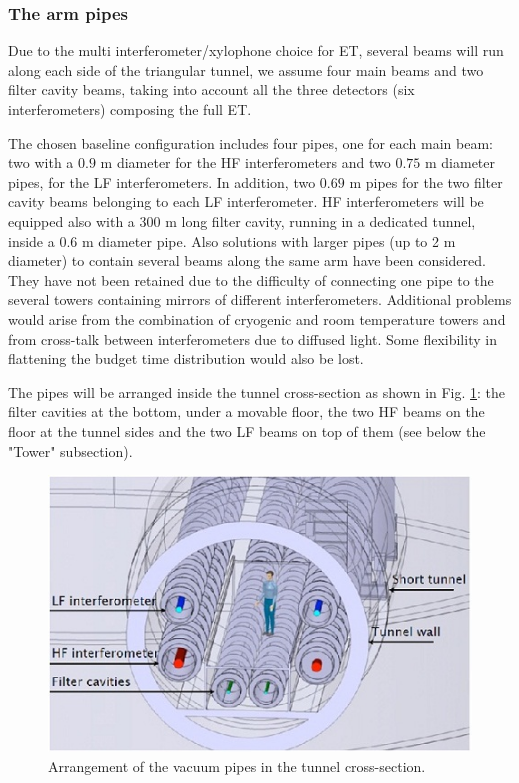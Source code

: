 \subsubsection{The arm pipes}

Due to the multi interferometer/xylophone choice for ET, several beams will run along each side of the triangular tunnel, we assume four main beams and two filter cavity beams, taking into account all the three detectors (six interferometers) composing the full ET.

The chosen baseline configuration includes four pipes, one for each main beam: two with a $0.9$ m diameter for the HF interferometers and two $0.75$ m diameter pipes, for the LF interferometers. In addition, two $0.69$ m pipes for the two filter cavity beams belonging to each LF interferometer. HF interferometers will be equipped also with a 300 m long filter cavity, running in a dedicated tunnel, inside a 0.6 m diameter pipe. Also solutions with larger pipes (up to 2 m diameter) to contain several beams along the same arm have been considered. They have not been retained due to the difficulty of connecting one pipe to the several towers containing mirrors of different interferometers. Additional problems would arise from the combination of cryogenic and room temperature towers and from cross-talk between interferometers due to diffused light. Some flexibility in flattening the budget time distribution would also be lost.

The pipes will be arranged inside the tunnel cross-section as shown in Fig. \ref{fig:vac4}: the filter cavities at the bottom, under a movable floor, the two HF beams on the floor at the tunnel sides and the two LF beams on top of them (see below the "Tower" subsection).

\begin{figure}
\begin{center}
\includegraphics{Sec_SiteInfra/Figures/VAC4.jpg}
\caption{Arrangement of the vacuum pipes in the tunnel cross-section.}
\label{fig:vac4}
\end{center}
\end{figure}

